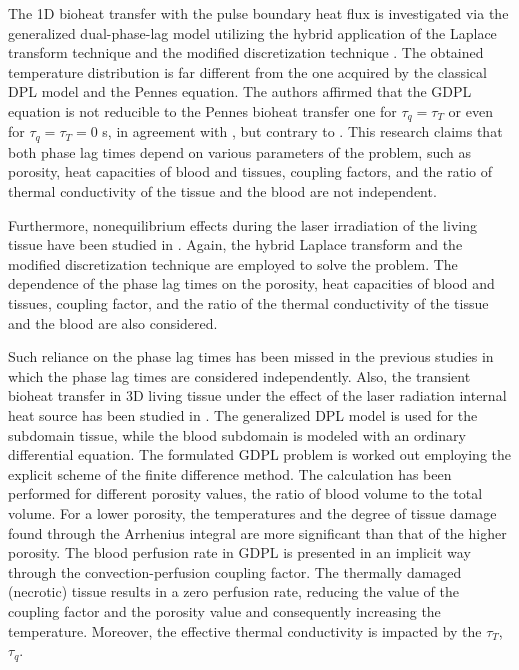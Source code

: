 \documentclass[sn-mathphys]{sn-jnl}%
\theoremstyle{thmstyleone}%
\theoremstyle{thmstyletwo}%
\theoremstyle{thmstylethree}%
\begin{document}
{The 1D bioheat transfer with the pulse boundary heat flux is investigated via the generalized dual-phase-lag model utilizing the hybrid application of the Laplace transform technique and the modified discretization technique \cite{Liu20151}. The obtained temperature distribution is far different from the one acquired by the classical DPL model and the Pennes equation. The authors affirmed that the GDPL equation is not reducible to the Pennes bioheat transfer one for $\tau_q=\tau_T$ or even for $\tau_q=\tau_T=0 $ s, in agreement with \cite{Liu20151}, but contrary to \cite{Afrin2012,Hooshmand20151}. This research \cite{Liu20151} claims that both phase lag times depend on various parameters of the problem, such as porosity, heat capacities of blood and tissues, coupling factors, and the ratio of thermal conductivity of the tissue and the blood are not independent. 

Furthermore, nonequilibrium effects during the laser irradiation of the living tissue have been studied in \cite{KCLiu20162}. Again, the hybrid Laplace transform and the modified discretization technique are employed to solve the problem. The dependence of the phase lag times on the porosity, heat capacities of blood and tissues, coupling factor, and the ratio of the thermal conductivity of the tissue and the blood are also considered.

Such reliance on the phase lag times has been missed in the previous studies in which the phase lag times are considered independently. Also, the transient bioheat transfer in 3D living tissue under the effect of the laser radiation internal heat source has been studied in \cite{MJasinski2016}. The generalized DPL model is used for the subdomain tissue, while the blood subdomain is modeled with an ordinary differential equation. The formulated GDPL problem is worked out employing the explicit scheme of the finite difference method. The calculation has been performed for different porosity values, the ratio of blood volume to the total volume. For a lower porosity, the temperatures and the degree of tissue damage found through the Arrhenius integral are more significant than that of the higher porosity. The blood perfusion rate in GDPL is presented in an implicit way through the convection-perfusion coupling factor. The thermally damaged (necrotic) tissue results in a zero perfusion rate, reducing the value of the coupling factor and the porosity value and consequently increasing the temperature. Moreover, the effective thermal conductivity is impacted by the $\tau_T$, $\tau_q$.

}
\end{document}
